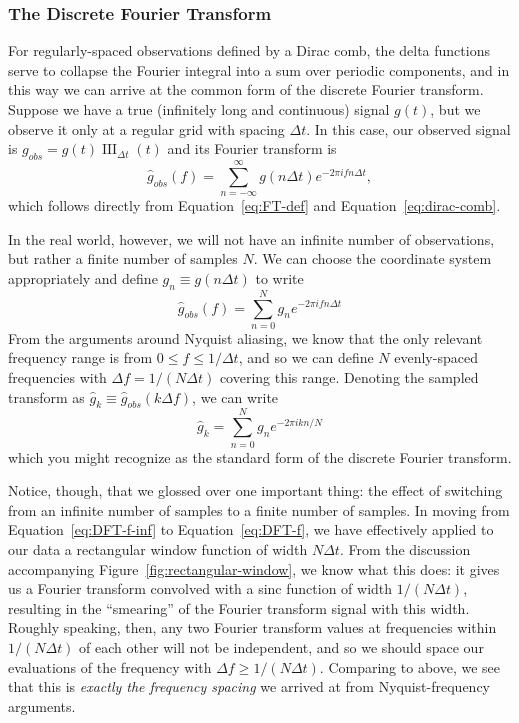 \documentclass[preprint]{aastex}
\DeclareMathOperator{\III}{III}
\newcommand{\fig}[1]{Figure~\ref{fig:#1}}
\newcommand{\Eq}[1]{Equation~\ref{eq:#1}}
\newcommand{\eq}[1]{\Eq{#1}}
\newcommand{\eqlabel}[1]{\label{eq:#1}}
\begin{document}
\subsubsection{The Discrete Fourier Transform}
For regularly-spaced observations defined by a Dirac comb, the delta functions
serve to collapse the Fourier integral into a sum over periodic components,
and in this way we can arrive at the common form of the discrete Fourier
transform.
Suppose we have a true (infinitely long and continuous) signal $g(t)$, but
we observe it only at a regular grid with spacing $\Delta t$. In this case, our
observed signal is $g_{obs} = g(t) \III_{\Delta t}(t)$ and its Fourier transform is
\begin{equation}
  \hat{g}_{obs}(f) = \sum_{n=-\infty}^\infty g(n\Delta t) e^{-2\pi i f n \Delta t},
  \eqlabel{DFT-f-inf}
\end{equation}
which follows directly from \eq{FT-def} and \eq{dirac-comb}.

In the real world, however, we will not have an infinite number of observations,
but rather a finite number of samples $N$.
We can choose the coordinate system appropriately and define
$g_n \equiv g(n\Delta t)$ to write
\begin{equation}
  \hat{g}_{obs}(f) = \sum_{n=0}^N g_n e^{-2\pi i f n \Delta t}
  \eqlabel{DFT-f}
\end{equation}
From the arguments around Nyquist aliasing, we know that the only relevant
frequency range is from $0 \le f \le 1/\Delta t$, and so we can define $N$
evenly-spaced frequencies with $\Delta f = 1 / (N\Delta t)$ covering this range.
Denoting the sampled transform as
$\hat{g}_k \equiv \hat{g}_{obs}(k\Delta f)$, we can write
\begin{equation}
  \hat{g}_k = \sum_{n=0}^N g_n e^{-2\pi i k n / N}
  \eqlabel{DFT}
\end{equation}
which you might recognize as the standard form of the discrete Fourier
transform.

Notice, though, that we glossed over one important thing: the effect of switching
from an infinite number of samples to a finite number of samples.
In moving from \eq{DFT-f-inf} to \eq{DFT-f}, we have effectively applied
to our data a rectangular window function of width $N\Delta t$.
From the discussion accompanying \fig{rectangular-window}, we know what this
does: it gives us a Fourier transform convolved with a sinc function of width
$1 / (N\Delta t)$, resulting in the ``smearing'' of the Fourier transform signal
with this width.
Roughly speaking, then, any two Fourier transform values at frequencies within
$1/(N\Delta t)$ of each other will not be independent, and so we should space
our evaluations of the frequency with $\Delta f \ge 1/(N\Delta t)$.
Comparing to above, we see that this is {\it exactly the frequency spacing}
we arrived at from Nyquist-frequency arguments.
\end{document}
